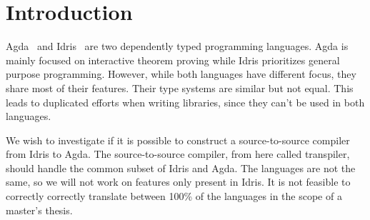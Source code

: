 \documentclass[parskip=half]{scrartcl}
\begin{document}

%
%
%






\section{Introduction}

Agda~\cite{agda} and Idris~\cite{idris} are two dependently typed programming
languages.  Agda is mainly focused on interactive theorem proving while Idris
prioritizes general purpose programming.  However, while both languages have
different focus, they share most of their features. Their type systems are
similar but not equal. This leads to duplicated efforts
when writing libraries, since they can't be used in both languages.

We wish to investigate if it is possible to construct a source-to-source
compiler from Idris to Agda. The source-to-source compiler, from here called
transpiler, should handle the common subset of Idris and Agda. The languages
are not the same, so we will not work on features only present in Idris.
It is not feasible to correctly correctly translate between 100\% of the
languages in the scope of a master's thesis.
\end{document}
